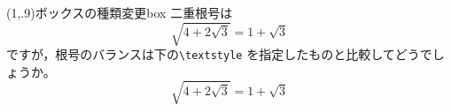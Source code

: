\def\showProgbox{screen}
\begin{showProg}(1,.9){ボックスの種類変更}{box}
二重根号は
\[
  \sqrt{4+2\sqrt3}=1+\sqrt3
\]
ですが，根号のバランスは下の\verb+\textstyle+
を指定したものと比較してどうでしょうか。
\[
  \textstyle\sqrt{4+2\sqrt3}=1+\sqrt3
\]
\end{showProg}

